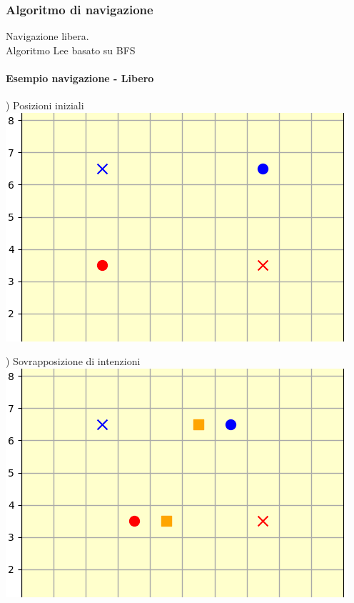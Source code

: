 \documentclass[12pt]{article}
\begin{document}
\subsubsection{Algoritmo di navigazione}
Navigazione libera. \\
Algoritmo Lee \cite{Lee} 
basato su BFS \cite{BFS}

\newpage

\paragraph{Esempio navigazione - Libero}
\vspace{0.2cm}

\begin{minipage}[ht]{0.45\linewidth}
) Posizioni iniziali
\includegraphics[width=\textwidth]{SimulazioniNavigazione/2AGV_NoConflitti/0.png}
\end{minipage}
\begin{minipage}[ht]{0.45\linewidth}
) Sovrapposizione di intenzioni
\includegraphics[width=\textwidth]{SimulazioniNavigazione/2AGV_NoConflitti/1.png}
\end{minipage}\\
\end{document}
